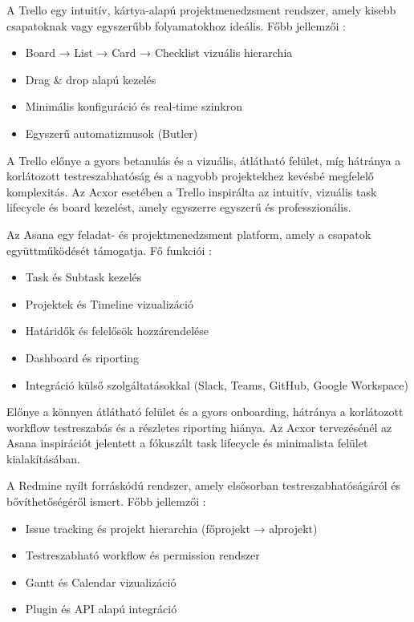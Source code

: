 
A Trello egy intuitív, kártya-alapú projektmenedzsment rendszer, amely kisebb csapatoknak vagy egyszerűbb folyamatokhoz ideális. Főbb jellemzői \cite{trello}:

\begin{itemize}
\item Board → List → Card → Checklist vizuális hierarchia
\item Drag \& drop alapú kezelés
\item Minimális konfiguráció és real-time szinkron
\item Egyszerű automatizmusok (Butler)
\end{itemize}

A Trello előnye a gyors betanulás és a vizuális, átlátható felület, míg hátránya a korlátozott testreszabhatóság és a nagyobb projektekhez kevésbé megfelelő komplexitás. Az Acxor esetében a Trello inspirálta az intuitív, vizuális task lifecycle és board kezelést, amely egyszerre egyszerű és professzionális.


Az Asana egy feladat- és projektmenedzsment platform, amely a csapatok együttműködését támogatja. Fő funkciói \cite{asana}:

\begin{itemize}
\item Task és Subtask kezelés
\item Projektek és Timeline vizualizáció
\item Határidők és felelősök hozzárendelése
\item Dashboard és riporting
\item Integráció külső szolgáltatásokkal (Slack, Teams, GitHub, Google Workspace)
\end{itemize}

Előnye a könnyen átlátható felület és a gyors onboarding, hátránya a korlátozott workflow testreszabás és a részletes riporting hiánya. Az Acxor tervezésénél az Asana inspirációt jelentett a fókuszált task lifecycle és minimalista felület kialakításában.


A Redmine nyílt forráskódú rendszer, amely elsősorban testreszabhatóságáról és bővíthetőségéről ismert. Főbb jellemzői \cite{redmine}:

\begin{itemize}
\item Issue tracking és projekt hierarchia (főprojekt → alprojekt)
\item Testreszabható workflow és permission rendszer
\item Gantt és Calendar vizualizáció
\item Plugin és API alapú integráció
\end{itemize}

